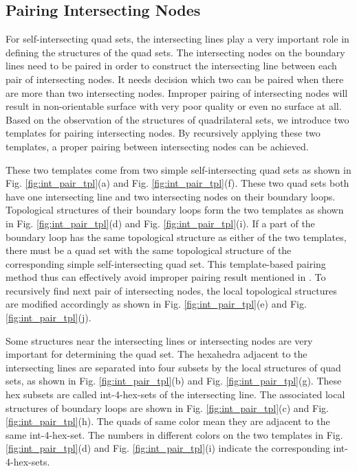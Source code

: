 \documentclass[final,5p,times,twocolumn]{elsarticle}
\begin{document}
\subsection{Pairing Intersecting Nodes}
\label{sec:int_pt_pair}
For self-intersecting quad sets, the intersecting lines play a very important role in defining the structures of the quad sets. The intersecting nodes on the boundary lines need to be paired in order to construct the intersecting line between each pair of intersecting nodes. It needs decision which two can be paired when there are more than two intersecting nodes. Improper pairing of intersecting nodes will result in non-orientable surface with very poor quality or even no surface at all\cite{Suzuki:2010hn}. Based on the observation of the structures of quadrilateral sets, we introduce two templates for pairing intersecting nodes. By recursively applying these two templates, a proper pairing between intersecting nodes can be achieved. 

These two templates come from two simple self-intersecting quad sets as shown in Fig. \ref{fig:int_pair_tpl}(a) and Fig. \ref{fig:int_pair_tpl}(f). These two quad sets both have one intersecting line and two intersecting nodes on their boundary loops. Topological structures of their boundary loops form the two templates as shown in Fig. \ref{fig:int_pair_tpl}(d) and Fig. \ref{fig:int_pair_tpl}(i). If a part of the boundary loop has the same topological structure as either of the two templates, there must be a quad set with the same topological structure of the corresponding simple self-intersecting quad set. This template-based pairing method thus can effectively avoid improper pairing result mentioned in \cite{Suzuki:2010hn}. To recursively find next pair of intersecting nodes, the local topological structures are modified accordingly as shown in Fig. \ref{fig:int_pair_tpl}(e) and Fig. \ref{fig:int_pair_tpl}(j).

Some structures near the intersecting lines or intersecting nodes are very important for determining the quad set. The hexahedra adjacent to the intersecting lines are separated into four subsets by the local structures of quad sets, as shown in Fig. \ref{fig:int_pair_tpl}(b) and Fig. \ref{fig:int_pair_tpl}(g). These hex subsets are called int-4-hex-sets of the intersecting line. The associated local structures of boundary loops are shown in Fig. \ref{fig:int_pair_tpl}(c) and Fig. \ref{fig:int_pair_tpl}(h). The quads of same color mean they are adjacent to the same int-4-hex-set. The numbers in different colors on the two templates in Fig. \ref{fig:int_pair_tpl}(d) and Fig. \ref{fig:int_pair_tpl}(i) indicate the corresponding int-4-hex-sets.
\end{document}
